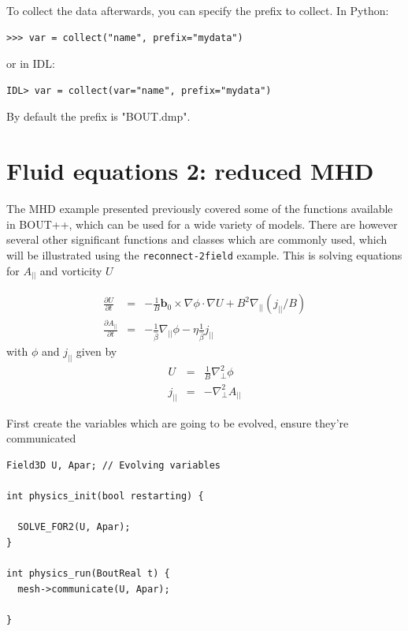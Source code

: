 \documentclass[12pt]{article}
\newcommand{\deriv}[2]{\ensuremath{\frac{\partial #1}{\partial #2}}}
\begin{document}
To collect the data afterwards, you can specify the prefix to collect. In Python:
\begin{verbatim}
>>> var = collect("name", prefix="mydata")
\end{verbatim}
or in IDL:
\begin{verbatim}
IDL> var = collect(var="name", prefix="mydata")
\end{verbatim}

By default the prefix is "BOUT.dmp".


\section{Fluid equations 2: reduced MHD}

The MHD example presented previously covered some of the functions available in BOUT++,
which can be used for a wide variety of models. There are however several other significant
functions and classes which are commonly used, which will be illustrated using the
\texttt{reconnect-2field} example. This is solving equations for $A_{||}$ and
vorticity $U$

\begin{eqnarray*}
\deriv{U}{t} &=& -\frac{1}{B}\mathbf{b}_0\times\nabla\phi\cdot\nabla U + B^2 \nabla_{||}\left(j_{||} / B\right) \\
\deriv{A_{||}}{t} &=& -\frac{1}{\hat{\beta}}\nabla_{||}\phi - \eta\frac{1}{\hat{\beta}} j_{||}
\end{eqnarray*}
with $\phi$ and $j_{||}$ given by
\begin{eqnarray*}
U &=& \frac{1}{B}\nabla_\perp^2\phi \\
j_{||} &=& -\nabla_\perp^2 A_{||}
\end{eqnarray*}

First create the variables which are going to be evolved, ensure they're
communicated 

\begin{lstlisting}
Field3D U, Apar; // Evolving variables

int physics_init(bool restarting) {
  
  SOLVE_FOR2(U, Apar);
}

int physics_run(BoutReal t) {
  mesh->communicate(U, Apar);
  
}
\end{lstlisting}
\end{document}
